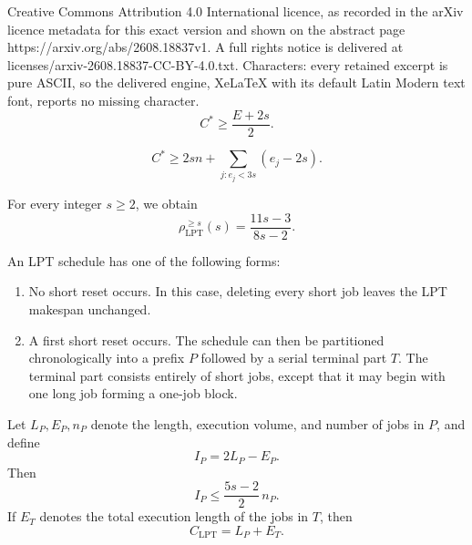 \documentclass[10pt,a4paper]{amsart}
\begin{document}
Creative Commons Attribution 4.0 International licence, as recorded in the arXiv licence metadata for this exact version and shown on the abstract page https://arxiv.org/abs/2608.18837v1. A full rights notice is delivered at licenses/arxiv-2608.18837-CC-BY-4.0.txt. Characters: every retained excerpt is pure ASCII, so the delivered engine, XeLaTeX with its default Latin Modern text font, reports no missing character.
\begin{equation}
C^*\ge \frac{E+2s}{2}.
\label{eq:lpt-machine-lb}
\end{equation}

\begin{equation}
C^*
\ge
2sn+\sum_{j:e_j<3s}(e_j-2s).
\label{eq:lpt-short-lb}
\end{equation}

\begin{theorem}
\label{thm:lpt-long-jobs}
For every integer \(s\ge2\), we obtain 
\[
\boxed{
\rho_{\mathrm{LPT}}^{\ge s}(s)
=
\frac{11s-3}{8s-2}.
}
\]
\end{theorem}

\begin{lemma}
\label{lem:lpt-prefix-tail}
An LPT schedule has one of the following forms:

\begin{enumerate}
\item No short reset occurs. In this case, deleting every short job leaves the
      LPT makespan unchanged.
\item A first short reset occurs. The schedule can then be partitioned
      chronologically into a prefix \(P\) followed by a serial terminal part
      \(T\). The terminal part consists entirely of short jobs, except that it
      may begin with one long job forming a one-job block.
\end{enumerate}

Let \(L_P,E_P,n_P\) denote the length, execution volume, and number of jobs in
\(P\), and define
\[
I_P=2L_P-E_P.
\]
Then
\begin{equation}
I_P\le\frac{5s-2}{2}\,n_P.
\label{eq:lpt-prefix-idle}
\end{equation}
If \(E_T\) denotes the total execution length of the jobs in \(T\), then
\begin{equation}
C_{\mathrm{LPT}}=L_P+E_T.
\label{eq:lpt-prefix-tail-length}
\end{equation}
\end{lemma}
\end{document}
